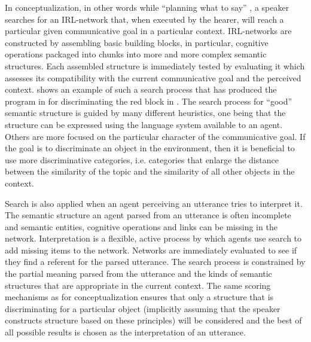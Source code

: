 In conceptualization, in other words while ``planning what to say'' 
\citep{steels2005planning}, a speaker searches for an IRL-network 
that, when executed by the hearer, will reach a particular given 
communicative goal in a particular context.  IRL-networks 
are constructed by assembling basic building
blocks, in particular, cognitive operations packaged into chunks
into more and more complex semantic structures. 
Each assembled structure is immediately tested by evaluating it which assesses
its compatibility with the current communicative goal and the perceived context.
 shows an example of such a search process 
that has produced the program in  for discriminating 
the red block in . 
The search process for ``good'' semantic structure is guided by 
many different heuristics, one being that the structure can be expressed using the
language system available to an agent. Others are more focused on the particular
character of the communicative goal. If the goal is to discriminate an object 
in the environment, then it is beneficial to use more discriminative categories, 
i.e. categories that enlarge the distance between the similarity of the topic and 
the similarity of all other objects in the context. 

Search is also applied when an agent perceiving an utterance  tries to 
interpret it. The semantic structure an agent 
parsed from an utterance is often incomplete and
semantic entities, cognitive operations and links can be
missing in the network. Interpretation is a flexible, active process
by which agents use search to add missing items to the network.
Networks are immediately evaluated to see if they find a referent for 
the parsed utterance. The search process is constrained by the partial 
meaning parsed from the utterance and
the kinds of semantic structures that are appropriate in the current context.
The same scoring mechanisms
as for conceptualization ensures that only a structure that is 
discriminating for a particular object (implicitly assuming that the 
speaker constructs structure based on these principles) will be considered 
and the best of all possible results is chosen as the interpretation of an utterance. 

